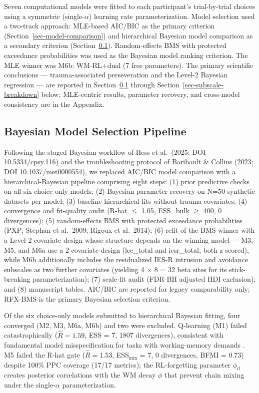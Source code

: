 \documentclass{article}
\begin{document}
Seven computational models were fitted to each participant's
trial-by-trial choices using a symmetric (single-\(\alpha\)) learning
rate parameterization. Model selection used a two-track approach:
MLE-based AIC/BIC as the primary criterion
(Section~\ref{sec-model-comparison}) and hierarchical Bayesian model
comparison as a secondary criterion
(Section~\ref{sec-bayesian-selection}). Random-effects BMS with
protected exceedance probabilities \citep{rigoux2014bayesian} was used
as the Bayesian model ranking criterion. The MLE winner was M6b:
WM-RL+dual (7 free parameters). The primary scientific conclusions ---
trauma-associated perseveration and the Level-2 Bayesian regression ---
are reported in Section~\ref{sec-bayesian-selection} through
Section~\ref{sec-subscale-breakdown} below; MLE-centric results,
parameter recovery, and cross-model consistency are in the Appendix.

\subsection{Bayesian Model Selection
Pipeline}\label{sec-bayesian-selection}

Following the staged Bayesian workflow of Hess et al.~(2025; DOI
10.5334/cpsy.116) and the troubleshooting protocol of Baribault \&
Collins (2023; DOI 10.1037/met0000554), we replaced AIC/BIC model
comparison with a hierarchical-Bayesian pipeline comprising eight steps:
(1) prior predictive checks on all six choice-only models; (2) Bayesian
parameter recovery on N=50 synthetic datasets per model; (3) baseline
hierarchical fits without trauma covariates; (4) convergence and
fit-quality audit (R-hat \(\leq\) 1.05, ESS\_bulk \(\geq\) 400, 0
divergences); (5) random-effects BMS with protected exceedance
probabilities (PXP; Stephan et al.~2009; Rigoux et al.~2014); (6) refit
of the BMS winner with a Level-2 covariate design whose structure
depends on the winning model --- M3, M5, and M6a use a 2-covariate
design (lec\_total and iesr\_total, both z-scored), while M6b
additionally includes the residualized IES-R intrusion and avoidance
subscales as two further covariates (yielding 4 \(\times\) 8 = 32 beta
sites for its stick-breaking parameterization); (7) scale-fit audit
(FDR-BH adjusted HDI exclusion); and (8) manuscript tables. AIC/BIC are
reported for legacy comparability only; RFX-BMS is the primary Bayesian
selection criterion.

Of the six choice-only models submitted to hierarchical Bayesian
fitting, four converged (M2, M3, M6a, M6b) and two were excluded.
Q-learning (M1) failed catastrophically (\(\hat{R} = 1.59\), ESS = 7,
1807 divergences), consistent with fundamental model misspecification
for tasks with working-memory demands \citep{collins2014working}. M5
failed the R-hat gate (\(\hat{R} = 1.53\), ESS\(_{\min}\) = 7, 0
divergences, BFMI = 0.73) despite 100\% PPC coverage (17/17 metrics);
the RL-forgetting parameter \(\phi_{\text{rl}}\) creates posterior
correlations with the WM decay \(\phi\) that prevent chain mixing under
the single-\(\alpha\) parameterization.
\end{document}
